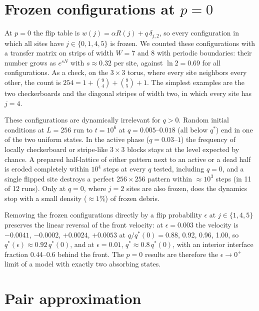 \documentclass[pre,twocolumn,superscriptaddress,showpacs,floatfix]{revtex4-2}
\newcommand{\qs}{q^{*}}
\begin{document}
\section{Frozen configurations at $p = 0$}
\label{app:frozen}

At $p = 0$ the flip table is $w(j) = \alpha R(j) + q\,\delta_{j,2}$, so every configuration in
which all sites have $j\in\{0,1,4,5\}$ is frozen. We counted these configurations with a transfer
matrix on strips of width $W = 7$ and $8$ with periodic boundaries: their number grows as
$e^{sN}$ with $s\approx 0.32$ per site, against $\ln 2 = 0.69$ for all configurations. As a check,
on the $3\times3$ torus, where every site neighbors every other, the count is
$254 = 1 + \binom94 + \binom95 + 1$. The simplest examples are the two checkerboards and the
diagonal stripes of width two, in which every site has $j = 4$.

These configurations are dynamically irrelevant for $q>0$. Random initial conditions at $L = 256$
run to $t = 10^6$ at $q = 0.005$--$0.018$ (all below $\qs$) end in one of the two uniform states.
In the active phase ($q = 0.03$--$1$) the frequency of locally checkerboard or stripe-like
$3\times3$ blocks stays at the level expected by chance. A prepared half-lattice of either pattern
next to an active or a dead half is eroded completely within $10^4$ steps at every $q$ tested,
including $q = 0$, and a single flipped site destroys a perfect $256\times256$ pattern within
$\approx 10^3$ steps (in 11 of 12 runs). Only at $q = 0$, where $j = 2$ sites are also frozen, does
the dynamics stop with a small density ($\approx 1\%$) of frozen debris.

Removing the frozen configurations directly by a flip probability $\epsilon$ at
$j\in\{1,4,5\}$ preserves the linear reversal of the front velocity: at $\epsilon = 0.003$ the
velocity is $-0.0041$, $-0.0002$, $+0.0024$, $+0.0053$ at $q/\qs(0) = 0.88$, 0.92, 0.96, 1.00, so
$\qs(\epsilon)\approx 0.92\,\qs(0)$, and at $\epsilon = 0.01$, $\qs\approx 0.8\,\qs(0)$, with
an interior interface fraction 0.44--0.6 behind the front. The $p = 0$ results are therefore the
$\epsilon\to 0^+$ limit of a model with exactly two absorbing states.

\section{Pair approximation}
\label{app:pa}
\end{document}
